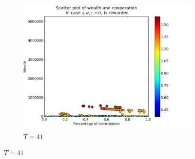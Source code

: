 \documentclass{article}
\begin{document}
\begin{figure}[h]
\begin{subfigure}[t]{0.333\textwidth}
\centering
\includegraphics[width=\textwidth]{nq_output_scatter/scatter_ranking_1_041.png}
\caption{$T = 41$}
\end{subfigure}%

\bigskip


\end{figure}
\end{document}
